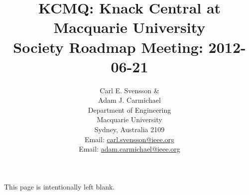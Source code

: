 \title{
  KCMQ: Knack Central at Macquarie University \\
  Society Roadmap Meeting: 2012-06-21
}
%
\author{
  Carl E. Svensson \& \\
  Adam J. Carmichael \\
  Department of Engineering\\
  Macquarie University\\
  Sydney, Australia 2109\\
  Email: \url{carl.svensson@ieee.org} \\
  Email: \url{adam.carmichael@ieee.org}
}%
%

%
\maketitle
%
\tableofcontents
\chapter{}
\vspace*{\fill}
\begin{center}
This page is intentionally left blank.
\end{center}
\vspace*{\fill}















